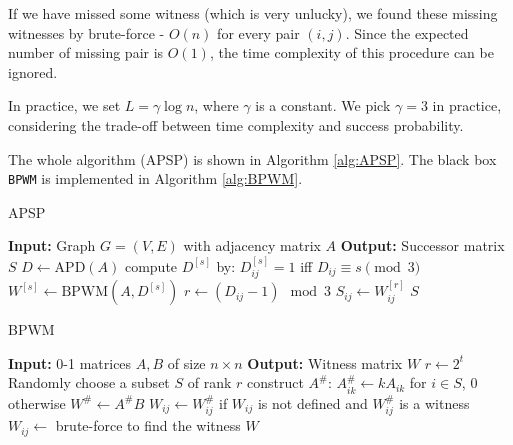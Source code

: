 \documentclass[11pt]{article}
\theoremstyle{plain}
\begin{document}
If we have missed some witness (which is very unlucky), we found these missing witnesses by brute-force - $O(n)$ for every pair $(i,j)$. Since the expected number of missing pair is $O(1)$, the time complexity of this procedure can be ignored.

In practice, we set $L=\gamma\log n$, where $\gamma$ is a constant. We pick $\gamma=3$ in practice, considering the trade-off between time complexity and success probability. 

The whole algorithm (APSP) is shown in Algorithm \ref{alg:APSP}. The black box \texttt{BPWM} is implemented in Algorithm \ref{alg:BPWM}.

\begin{algorithm}
    \caption{APSP}
    \label{alg:APSP}
    \begin{algorithmic}[1]
        \STATE \textbf{Input:} Graph $G=(V,E)$ with adjacency matrix $A$
        \STATE \textbf{Output:} Successor matrix $S$
        \STATE $D\leftarrow \text{APD}(A)$
            \STATE compute $D^{[s]}$ by: $D^{[s]}_{ij}=1$ iff $D_{ij}\equiv s\pmod 3$
            \STATE $W^{[s]}\leftarrow \text{BPWM}(A,D^{[s]})$
        \ENDFOR
                \STATE $r\leftarrow (D_{ij}-1)\mod 3$
                \STATE $S_{ij}\leftarrow W^{[r]}_{ij}$
            \ENDFOR
        \ENDFOR
    \RETURN $S$
    \end{algorithmic}
\end{algorithm}

\begin{algorithm}
    \caption{BPWM}
    \label{alg:BPWM}
    \begin{algorithmic}[1]
        \STATE \textbf{Input:} 0-1 matrices $A,B$ of size $n\times n$
        \STATE \textbf{Output:} Witness matrix $W$
            \STATE $r\leftarrow 2^t$
                \STATE Randomly choose a subset $S$ of rank $r$
                \STATE construct $A^{\#}$: $A^{\#}_{ik}\leftarrow kA_{ik}$ for $i\in S$, $0$ otherwise
                \STATE $W^{\#}\leftarrow A^{\#}B$
                    \STATE $W_{ij}\leftarrow W^{\#}_{ij}$ if $W_{ij}$ is not defined and $W^{\#}_{ij}$ is a witness
                \ENDFOR
            \ENDFOR
        \ENDFOR
                \STATE $W_{ij}\leftarrow$ brute-force to find the witness
            \ENDIF
        \ENDFOR
    \RETURN $W$
    \end{algorithmic}
\end{algorithm}
\end{document}
